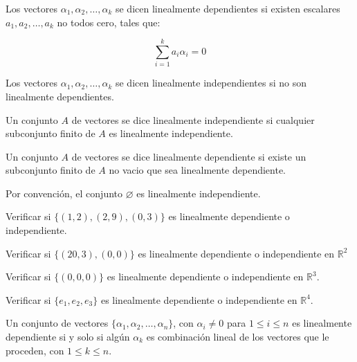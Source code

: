 		\begin{definicion}
			Los vectores $\alpha_1, \alpha_2, \dots, \alpha_k$ se dicen linealmente dependientes si existen escalares $a_1, a_2, \dots, a_k$ no todos cero, tales que:

			\begin{equation}
				\sum_{i=1}^k a_i \alpha_i = 0
			\end{equation}

			Los vectores $\alpha_1, \alpha_2, \dots, \alpha_k$ se dicen linealmente independientes si no son linealmente dependientes.
		\end{definicion}

		\begin{definicion}
			Un conjunto $A$ de vectores se dice linealmente independiente si cualquier subconjunto finito de $A$ es linealmente independiente.
		\end{definicion}

		\begin{definicion}
			Un conjunto $A$ de vectores se dice linealmente dependiente si existe un subconjunto finito de $A$ no vacio que sea linealmente dependiente.
		\end{definicion}

		\begin{observacion}
			Por convención, el conjunto $\varnothing$ es linealmente independiente.
		\end{observacion}

		\begin{ejemplo}
			Verificar si $\{(1, 2), (2, 9), (0, 3)\}$ es linealmente dependiente o independiente.
		\end{ejemplo}

		\begin{ejercicio}
			Verificar si $\{(20, 3), (0, 0)\}$ es linealmente dependiente o independiente en $\mathbb{R}^2$
		\end{ejercicio}

		\begin{ejercicio}
			Verificar si $\{(0, 0, 0)\}$ es linealmente dependiente o independiente en $\mathbb{R}^3$.
		\end{ejercicio}

		\begin{ejercicio}
			Verificar si $\{e_1, e_2, e_3\}$ es linealmente dependiente o independiente en $\mathbb{R}^4$.
		\end{ejercicio}

		\begin{proposicion}
			Un conjunto de vectores $\{\alpha_1, \alpha_2, \dots, \alpha_n\}$, con $\alpha_i \ne 0$ para $1 \leq i \leq n$ es linealmente dependiente si y solo si algún $\alpha_k$ es combinación lineal de los vectores que le proceden, con $1 \leq k \leq n$.
		\end{proposicion}

